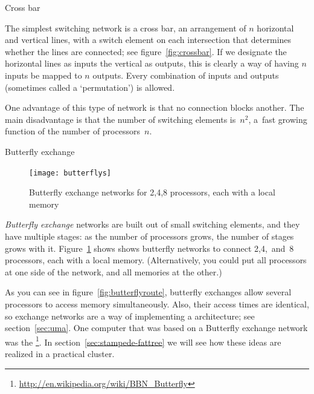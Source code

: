  {Cross bar}

\begin{notlulu}
  \crossbarfig
\end{notlulu}
%
\begin{lulu}
  \crossbarfig
\end{lulu}
%
The simplest switching network is a cross bar, an arrangement of $n$
horizontal and vertical lines, with a switch element on each
intersection that determines whether the lines are connected; see
figure~\ref{fig:crossbar}. If we designate the horizontal lines as
inputs the vertical as outputs, this is clearly a way of having $n$
inputs be mapped to $n$ outputs. Every combination of inputs and
outputs (sometimes called a `permutation') is allowed.

One advantage of this type of network is that no connection 
blocks another.
The main disadvantage  is that the number of 
switching elements is~$n^2$, a~fast growing function of the
number of processors~$n$.

 {Butterfly exchange}

\begin{figure}[ht]
  \texttt{[image: butterflys]}
  \caption{Butterfly exchange networks for 2,4,8 processors, each with
    a local memory}
  \label{fig:butterfly}
\end{figure}

\emph{Butterfly exchange} networks are built out of small switching
elements, and they have multiple stages: as the number of processors
grows, the number of stages grows with it. Figure~\ref{fig:butterfly}
shows shows butterfly networks to connect 2,4,~and~8 processors, each
with a local memory. (Alternatively, you could put all processors at
one side of the network, and all memories at the other.)

As you can see in figure~\ref{fig:butterflyroute}, butterfly exchanges
allow several processors to access memory simultaneously. Also, their
access times are identical, so exchange networks are a way of
implementing a  architecture; see
section~\ref{sec:uma}. One computer that was based on a Butterfly
exchange network was the \footnote
{\url{http://en.wikipedia.org/wiki/BBN_Butterfly}}.
In section~\ref{sec:stampede-fattree} we will see how these ideas are
realized in a practical cluster.

